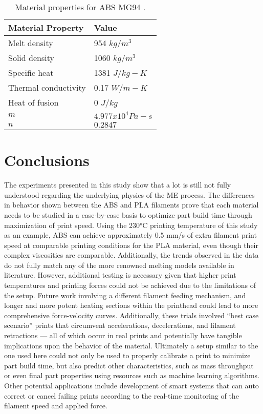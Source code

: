 \documentclass[main.tex]{subfiles}
\begin{document}
\begin{table}[!htbp] 
	\renewcommand{\arraystretch}{1.5}
	\centering
	\caption{Material properties for ABS MG94 \cite{ColonQuintana2020}.}
	\begin{tabular}{C C} 
		\toprule
		\textbf{Material Property} & \textbf{Value}\\
		\midrule
		Melt density & 954 $kg/m^3$\\
		Solid density & 1060 $kg/m^3$\\
		Specific heat & 1381 $J/kg-K$\\
		Thermal conductivity & 0.17 $W/m-K$\\
		Heat of fusion & 0 $J/kg$\\
		\midrule
		$m$ & $4.977x10^{4} Pa - s$\\
		$n$ & $0.2847$\\
		\bottomrule
	\end{tabular}
	\label{tab:mat_prop_models_1}
\end{table}

\section{Conclusions}

The experiments presented in this study show that a lot is still not fully understood regarding the underlying physics of the ME process. The differences in behavior shown between the ABS and PLA filaments prove that each material needs to be studied in a case-by-case basis to optimize part build time through maximization of print speed. Using the 230°C printing temperature of this study as an example, ABS can achieve approximately 0.5 mm/s of extra filament print speed at comparable printing conditions for the PLA material, even though their complex viscosities are comparable. Additionally, the trends observed in the data do not fully match any of the more renowned melting models available in literature. However, additional testing is necessary given that higher print temperatures and printing forces could not be achieved due to the limitations of the setup. Future work involving a different filament feeding mechanism, and longer and more potent heating sections within the printhead could lead to more comprehensive force-velocity curves. Additionally, these trials involved “best case scenario” prints that circumvent accelerations, decelerations, and filament retractions — all of which occur in real prints and potentially have tangible implications upon the behavior of the material. 
Ultimately a setup similar to the one used here could not only be used to properly calibrate a print to minimize part build time, but also predict other characteristics, such as mass throughput or even final part properties using resources such as machine learning algorithms. Other potential applications include development of smart systems that can auto correct or cancel failing prints according to the real-time monitoring of the filament speed and applied force.

% 
%
%
\end{document}
